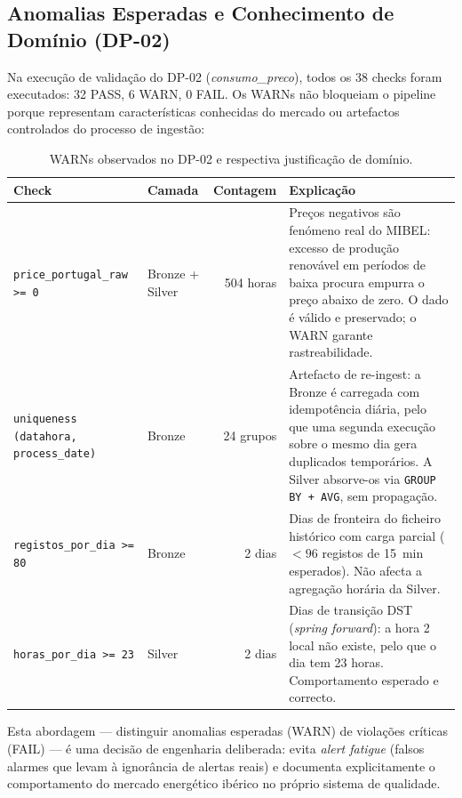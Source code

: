 \documentclass[11pt,a4paper]{article}
\begin{document}
\subsection{Anomalias Esperadas e Conhecimento de Domínio (DP-02)}

Na execução de validação do DP-02 (\textit{consumo\_preco}), todos os 38 checks foram executados: 32 PASS, 6 WARN, 0 FAIL. Os WARNs não bloqueiam o pipeline porque representam características conhecidas do mercado ou artefactos controlados do processo de ingestão:

\begin{table}[h!]
\centering
\small
\begin{tabular}{p{4.8cm}lrp{5.5cm}}
\toprule
\textbf{Check} & \textbf{Camada} & \textbf{Contagem} & \textbf{Explicação} \\
\midrule
\texttt{price\_portugal\_raw >= 0} & Bronze + Silver & 504 horas & Preços negativos são fenómeno real do MIBEL: excesso de produção renovável em períodos de baixa procura empurra o preço abaixo de zero. O dado é válido e preservado; o WARN garante rastreabilidade. \\
\addlinespace
\texttt{uniqueness (datahora,} \texttt{process\_date)} & Bronze & 24 grupos & Artefacto de re-ingest: a Bronze é carregada com idempotência diária, pelo que uma segunda execução sobre o mesmo dia gera duplicados temporários. A Silver absorve-os via \texttt{GROUP BY + AVG}, sem propagação. \\
\addlinespace
\texttt{registos\_por\_dia >= 80} & Bronze & 2 dias & Dias de fronteira do ficheiro histórico com carga parcial ($<96$ registos de 15~min esperados). Não afecta a agregação horária da Silver. \\
\addlinespace
\texttt{horas\_por\_dia >= 23} & Silver & 2 dias & Dias de transição DST (\textit{spring forward}): a hora 2 local não existe, pelo que o dia tem 23 horas. Comportamento esperado e correcto. \\
\bottomrule
\end{tabular}
\caption{WARNs observados no DP-02 e respectiva justificação de domínio.}
\label{tab:warns_dp02}
\end{table}

Esta abordagem --- distinguir anomalias esperadas (WARN) de violações críticas (FAIL) --- é uma decisão de engenharia deliberada: evita \textit{alert fatigue} (falsos alarmes que levam à ignorância de alertas reais) e documenta explicitamente o comportamento do mercado energético ibérico no próprio sistema de qualidade.
\end{document}
